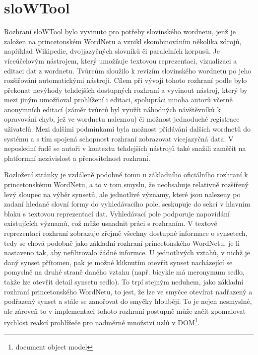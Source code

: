 \documentclass[a4paper, 11pt, oneside]{book}
\newcommand\ex{\textsf}
\begin{document}
			\section{sloWTool}
			\label{vis:slowtool}

				Rozhraní sloWTool bylo vyvinuto pro potřeby slovinského wordnetu, jenž je založen na princetonském WordNetu a vznikl skombinováním několika zdrojů, například Wikipedie, dvojjazyčných slovníků či paralelních korpusů. Je víceúčelovým nástrojem, který umožňuje textovou reprezentaci, vizualizaci a editaci dat z wordnetu. Tvůrcům sloužilo k revizím slovinského wordnetu po jeho rozšiřování automatickými nástroji. \parencite{fivser2012slownet} Cílem při vývoji tohoto rozhraní podle \textcite{fivser2011visualizing} bylo překonat nevýhody tehdejších dostupných rozhraní a vyvinout nástroj, který by mezi jiným umožňoval prohlížení i editaci, spolupráci mnoha autorů včetně anonymních editací (záměr tvůrců byl využít náhodných návštěvníků k opravování chyb, jež ve wordnetu naleznou) či možnost jednoduché registrace uživatelů. Mezi dalšími podmínkami byla možnost přidávání dalších wordnetů do systému a s tím spojená schopnost rozhraní zobrazovat vícejazyčná data. V neposlední řadě se autoři v kontextu tehdejších nástrojů také snažili zaměřit na platformní nezávislost a přenositelnost rozhraní. 

				Rozložení stránky je vzdáleně podobné tomu u základního oficiálního rozhraní k princetonskému WordNetu, a to v tom smyslu, že neobsahuje relativně rozšířený levý sloupec na výběr synsetů, ale jednotlivé významy, které jsou nalezeny po zadaní hledané slovní formy do vyhledávacího pole, seskupuje do sekcí v hlavním bloku s textovou reprezentací dat. Vyhledávací pole podporuje napovídání existujících významů, což může usnadnit práci s rozhraním. V textové reprezentací rozhraní zobrazuje zřejmě všechny dostupné informace o synsetech, tedy se chová podobně jako základní rozhraní princetonského WordNetu, je-li nastaveno tak, aby nefiltrovalo žádné informce. U jednotlivých vztahů, v nichž je daný synset přítomen, pak je možné kliknutím otevřít synset nacházející se pomyslně na druhé straně daného vztahu (např. \ex{bicykle} má meronymum \ex{sedlo}, takže lze otevřít detail synsetu \ex{sedlo}). To trpí stejným neduhem, jako základní rozhraní princetonského WordNetu, to jest, že lze ve smyčce otevírat nadřazený a podřazený synset a stále se zanořovat do smyčky hlouběji. To je nejen nesmyslné, ale zároveň to v implementaci tohoto rozhraní postupně může začít zpomalovat rychlost reakcí prohlížeče pro nadměrné množství uzlů v DOM\footnote{document object model}.
\end{document}
